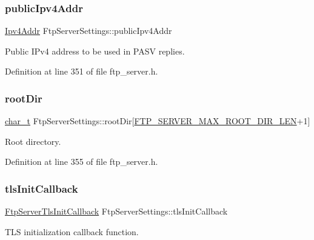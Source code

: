 \subsubsection{\texorpdfstring{public\+Ipv4\+Addr}{publicIpv4Addr}}
{\footnotesize\ttfamily \hyperlink{ipv4_8h_a411debb3d770caa0c06d3f73367da37f}{Ipv4\+Addr} Ftp\+Server\+Settings\+::public\+Ipv4\+Addr}



Public I\+Pv4 address to be used in P\+A\+SV replies. 



Definition at line 351 of file ftp\+\_\+server.\+h.

\mbox{\label{structFtpServerSettings_ad2fbe642f13e772c1019f1fc24acf613}} 
\subsubsection{\texorpdfstring{root\+Dir}{rootDir}}
{\footnotesize\ttfamily \hyperlink{compiler__port_8h_a40bb5262bf908c328fbcfbe5d29d0201}{char\+\_\+t} Ftp\+Server\+Settings\+::root\+Dir\mbox{[}\hyperlink{ftp__server_8h_a4ee960ae83791f045dfd014588b30b3d}{F\+T\+P\+\_\+\+S\+E\+R\+V\+E\+R\+\_\+\+M\+A\+X\+\_\+\+R\+O\+O\+T\+\_\+\+D\+I\+R\+\_\+\+L\+EN}+1\mbox{]}}



Root directory. 



Definition at line 355 of file ftp\+\_\+server.\+h.

\mbox{\label{structFtpServerSettings_a94ca7c826a4b8531615e59933bdfcc2a}} 
\subsubsection{\texorpdfstring{tls\+Init\+Callback}{tlsInitCallback}}
{\footnotesize\ttfamily \hyperlink{ftp__server_8h_a8b7b1540013ad04620b2a5030b23f54f}{Ftp\+Server\+Tls\+Init\+Callback} Ftp\+Server\+Settings\+::tls\+Init\+Callback}



T\+LS initialization callback function. 



